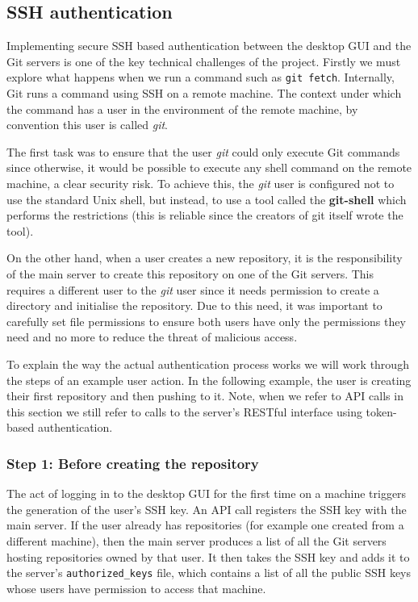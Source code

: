 \subsection{SSH authentication}

Implementing secure SSH based authentication between the desktop GUI and the Git servers is one of the key technical challenges of the project. Firstly we must explore what happens when we run a command such as \texttt{git fetch}. Internally, Git runs a command using SSH on a remote machine. The context under which the command has a user in the environment of the remote machine, by convention this user is called \emph{git}. 

The first task was to ensure that the user \emph{git} could only execute Git commands since otherwise, it would be possible to execute any shell command on the remote machine, a clear security risk. To achieve this, the \emph{git} user is configured not to use the standard Unix shell, but instead, to use a tool called the \textbf{git-shell} which performs the restrictions (this is reliable since the creators of git itself wrote the tool).

On the other hand, when a user creates a new repository, it is the responsibility of the main server to create this repository on one of the Git servers. This requires a different user to the \emph{git} user since it needs permission to create a directory and initialise the repository. Due to this need, it was important to carefully set file permissions to ensure both users have only the permissions they need and no more to reduce the threat of malicious access.

To explain the way the actual authentication process works we will work through the steps of an example user action. In the following example, the user is creating their first repository and then pushing to it. Note, when we refer to API calls in this section we still refer to calls to the server's RESTful interface using token-based authentication.

\subsubsection{Step 1: Before creating the repository}

The act of logging in to the desktop GUI for the first time on a machine triggers the generation of the user's SSH key. An API call registers the SSH key with the main server. If the user already has repositories (for example one created from a different machine), then the main server produces a list of all the Git servers hosting repositories owned by that user. It then takes the SSH key and adds it to the server's \texttt{authorized\_keys} file, which contains a list of all the public SSH keys whose users have permission to access that machine.

